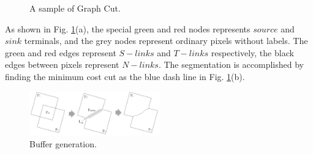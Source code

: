\documentclass[journal]{IEEEtran}
\begin{document}
\begin{figure}[!t]
	\centering
	\caption{A sample of Graph Cut.}
	\label{fig:graphcut}
\end{figure}
As shown in Fig. \ref{fig:graphcut}(a), the special green and red nodes represents $source$ and $sink$ terminals, and the grey nodes represent ordinary pixels without labels. The green and red edges represent $S-links$ and $T-links$ respectively, the black edges between pixels represent $N-links$. The segmentation is accomplished by finding the minimum cost cut as the blue dash line in Fig. \ref{fig:graphcut}(b).\par
\begin{figure}[!t]
	\centering
	\includegraphics[width=0.5\textwidth]{buffer}
	\caption{Buffer generation.}
	\label{fig:buffer}
\end{figure}
\end{document}
